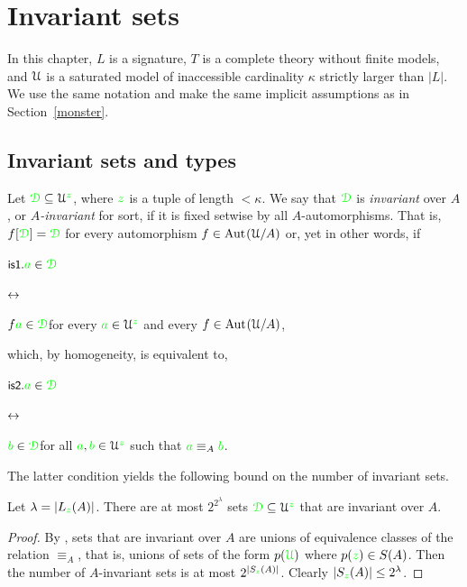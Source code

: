 \chapter{Invariant sets}
\label{invariant}

\def\medrel#1{\parbox[t]{5ex}{$\displaystyle\hfil #1$}}
\def\ceq#1#2#3{\parbox[t]{19ex}{$\displaystyle #1$}\medrel{#2}{$\displaystyle #3$}}

In this chapter, $L$ is a signature, $T$ is a complete theory without finite models, and $\EuScript U$ is a saturated model of inaccessible cardinality $\kappa$ strictly larger than $|L|$.
We use the same notation and make the same implicit assumptions as in Section~\ref{monster}.

\section{Invariant sets and types}\label{invariant_sets}

Let ${\color{green}\EuScript D}\subseteq\EuScript U^{\color{green} z}$, where ${\color{green} z}$ is a tuple of length $<\kappa$.
We say that ${\color{green}\EuScript D}$ is \emph{invariant\/} over $A$, or \emph{$A$-invariant\/} for sort, if it is fixed setwise by all $A$-automorphisms.
That is, $f[{\color{green}\EuScript D}]={\color{green}\EuScript D}$ for every automorphism $f\in{\rm Aut\kern.15ex}(\EuScript U/A)$ or, yet in other words, if

\ceq{\ssf{is1.}\hfill {\gr a}\in\grD}{\iff}{f{\gr a}\in\grD}\hfill for every ${\color{green} a}\in\EuScript U^{\color{green} z}$ and every $f\in{\rm Aut\kern.15ex}(\EuScript U/A)$,

which, by homogeneity, is equivalent to,

\ceq{\ssf{is2.}\hfill {\gr a}\in\grD}{\iff}{{\gr b}\in\grD}\hfill for all ${\color{green} a},{\color{green} b}\in\EuScript U^{\color{green} z}$ such that ${\color{green} a}\equiv_A{\color{green} b}$.

The latter condition yields the following bound on the number of invariant sets.

\begin{proposition}\label{prop_numberIS}
Let $\lambda=|L_{\color{green} z}(A)|$.
There are at most $2^{2^{\lambda}}$ sets ${\color{green}\EuScript D}\subseteq\EuScript U^{\color{green} z}$ that are invariant over $A$.
\end{proposition}
\begin{proof}
By , sets that are invariant over $A$ are unions of equivalence classes of the relation $\equiv_A$, that is, unions of sets of the form $p({\color{green}\EuScript U})$ where $p({\color{green} z})\in S(A)$.
Then the number of $A$-invariant sets is at most $2^{|S_{\color{green} z}(A)|}$.
Clearly $|S_{\color{green} z}(A)|\le 2^\lambda$.
\end{proof} 

